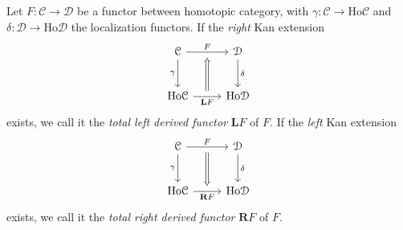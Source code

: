 \begin{definition}\label{dfn:10.4}
	Let $F : \mathcal{C}  \to \mathcal{D} $ be a functor between homotopic category, with $\gamma : \mathcal{C}  \to \mathrm{Ho} \mathcal{C} $ and $\delta : \mathcal{D}  \to \mathrm{Ho} \mathcal{D} $ the localization functors. If the \emph{right} Kan extension
	\[\begin{tikzcd}[row sep = 2.5em, column sep = 2.5em]
		\mathcal{C} \ar[" F "{name=F}, r] \ar[" \gamma "', d]  & \mathcal{D} \ar[" \delta ", d]  \\
		\mathrm{Ho} \mathcal{C} \ar[" \mathbf{L} F "'{name=LF}, r]  & \mathrm{Ho} \mathcal{D} 
		\arrow[from=LF, to=F, Rightarrow, shorten=5pt] 
	\end{tikzcd}\]
	exists, we call it the \emph{total left derived functor} $\mathbf{L} F$ of $F$. If the \emph{left} Kan extension
	\[\begin{tikzcd}[row sep = 2.5em, column sep = 2.5em]
		\mathcal{C} \ar[" F "{name=F}, r] \ar[" \gamma "', d]  & \mathcal{D} \ar[" \delta ", d]  \\
		\mathrm{Ho} \mathcal{C} \ar[" \mathbf{R} F "'{name=RF}, r]  & \mathrm{Ho} \mathcal{D} 
		\arrow[from=F, to=RF, Rightarrow, shorten=5pt] 
	\end{tikzcd}\]
	exists, we call it the \emph{total right derived functor} $\mathbf{R} F$ of $F$.
\end{definition}

